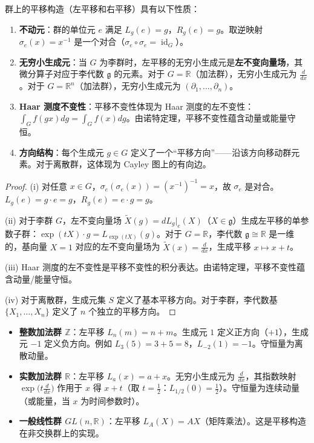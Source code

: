 \begin{proposition}[平移构造的基本性质]\label{prop:translation_operator}
群上的平移构造（左平移和右平移）具有以下性质：
\begin{enumerate}[label=(\roman*)]
    \item \textbf{不动元}：群的单位元 $e$ 满足 $L_g(e) = g$，$R_g(e) = g$。取逆映射 $\sigma_e(x) = x^{-1}$ 是一个对合（$\sigma_e \circ \sigma_e = \operatorname{id}_G$）。
    \item \textbf{无穷小生成元}：当 $G$ 为李群时，左平移的无穷小生成元是\textbf{左不变向量场}，其微分算子对应于李代数 $\mathfrak{g}$ 的元素。对于 $G = \mathbb{R}$（加法群），无穷小生成元为 $\frac{d}{dx}$。对于 $G = \mathbb{R}^n$（加法群），无穷小生成元为 $(\partial_1, \dots, \partial_n)$。
    \item \textbf{Haar 测度不变性}：平移不变性体现为 Haar 测度的左不变性：$\int_G f(gx) dg = \int_G f(x) dg$。由诺特定理，平移不变性蕴含动量或能量守恒。
    \item \textbf{方向结构}：每个生成元 $g \in G$ 定义了一个“平移方向”——沿该方向移动群元素。对于离散群，这体现为 Cayley 图上的有向边。
\end{enumerate}
\end{proposition}

\begin{proof}
(i) 对任意 $x \in G$，$\sigma_e(\sigma_e(x)) = (x^{-1})^{-1} = x$，故 $\sigma_e$ 是对合。$L_g(e) = g \cdot e = g$，$R_g(e) = e \cdot g = g$。

(ii) 对于李群 $G$，左不变向量场 $\tilde{X}(g) = dL_g|_e(X)$（$X \in \mathfrak{g}$）生成左平移的单参数子群：$\exp(tX) \cdot g = L_{\exp(tX)}(g)$。对于 $G = \mathbb{R}$，李代数 $\mathfrak{g} \cong \mathbb{R}$ 是一维的，基向量 $X = 1$ 对应的左不变向量场为 $\tilde{X}(x) = \frac{d}{dx}$，生成平移 $x \mapsto x + t$。

(iii) Haar 测度的左不变性是平移不变性的积分表达。由诺特定理，平移不变性蕴含动量/能量守恒。

(iv) 对于离散群，生成元集 $S$ 定义了基本平移方向。对于李群，李代数基 $\{X_1, \dots, X_n\}$ 定义了 $n$ 个独立的平移方向。
\end{proof}

\begin{example}[平移构造的实例]\label{ex:translation_operation_examples}
\begin{itemize}
    \item \textbf{整数加法群 $\mathbb{Z}$}：左平移 $L_n(m) = n+m$。生成元 $1$ 定义正方向（$+1$），生成元 $-1$ 定义负方向。例如 $L_3(5)=3+5=8$，$L_{-2}(1)=-1$。守恒量为离散动量。
    \item \textbf{实数加法群 $\mathbb{R}$}：左平移 $L_a(x) = a+x$。无穷小生成元为 $\frac{d}{dx}$，其指数映射 $\exp\big(t\frac{d}{dx}\big)$ 作用于 $x$ 得 $x+t$（取 $t=\frac12$：$L_{1/2}(0)=\frac12$）。守恒量为连续动量（或能量，当 $x$ 为时间参数时）。
    \item \textbf{一般线性群 $GL(n,\mathbb{R})$}：左平移 $L_A(X) = AX$（矩阵乘法）。这是平移构造在非交换群上的实现。
\end{itemize}
\end{example}

